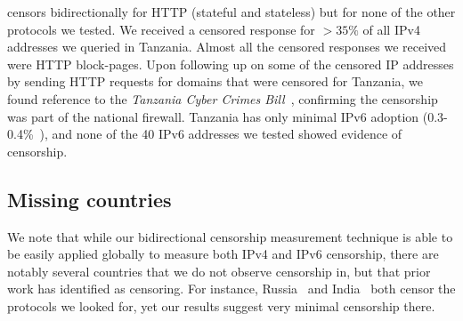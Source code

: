 
 censors bidirectionally for HTTP (stateful and stateless) but
for none of the other protocols we tested. We received a censored response for
$>35\%$ of all IPv4 addresses we queried in Tanzania. Almost all the censored
responses we received were HTTP block-pages. Upon following up on some of the
censored IP addresses by sending HTTP requests for domains that were censored
for Tanzania, we found reference to the \textit{Tanzania Cyber Crimes
Bill}~\cite{Tanzania45:online}, confirming the censorship was part of the
national firewall. Tanzania has only minimal IPv6 adoption
(0.3-0.4\%~\cite{akamai-ipv6,Google-IPv6}), and none of the 40 IPv6 addresses we
tested showed evidence of censorship.

%

%


\subsection{Missing countries}
\label{sec:compare}

\TabQuack

We note that while our bidirectional censorship measurement technique is able to
be easily applied globally to measure both IPv4 and IPv6 censorship, there are
notably several countries that we do not observe censorship in, but that prior
work has identified as censoring. For instance,
Russia~\cite{ramesh2020decentralized} and India~\cite{singh2020india} both
censor the protocols we looked for, yet our results suggest very minimal
censorship there.

